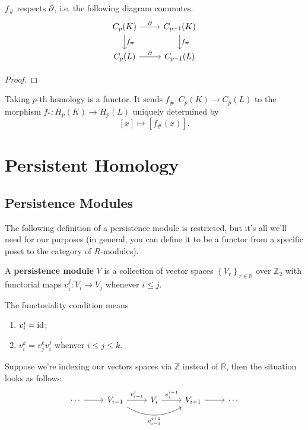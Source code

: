 \documentclass[twoside,10pt]{report}
\begin{document}
\begin{prop}
	$f_{\#}$ respects $\partial$, i.e. the following diagram commutes.
	\[
	\begin{tikzcd}
		C_{p}(K) \rar{\p}\dar{f_{\#}} & C_{p-1}(K) \dar{f_{\#}} \\
		C_{p}(L) \rar{\p} & C_{p-1}(L)
	\end{tikzcd}
	\] 
\end{prop}
\begin{proof}
\end{proof}

\begin{thrm}[]
	Taking $p$-th homology is a functor. It sends $f_{\#}:C_{p}(K)\to C_{p}(L)$ to the morphism $f_{*}:H_{p}(K) \to H_{p}(L)$ uniquely determined by
	\[
		[x] \mapsto [f_{\#}(x)].
	\] 
\end{thrm}



\chapter{Persistent Homology}

\section{Persistence Modules}

The following definition of a persistence module is restricted, but it's all we'll need for our purposes (in general, you can define it to be a functor from a specific poset to the category of $R$-modules). 

\begin{defn}[]
A \textbf{persistence module} $V$ is a collection of vector spaces $\left\{ V_{r} \right\}_{r \in \mathbb{R}}$ over $\mathbb{Z}_2$ with functorial maps $v_{i}^{j}:V_{i}\to V_{j}$ whenever $i \leq j$. 
\end{defn}
The functoriality condition means
\begin{enumerate}
	\item $v_{i}^{i} = \operatorname{id}$;
	\item $v_{i}^{k} = v_{j}^{k} v_{i}^{j}$ whenver $i \leq j \leq k$.
\end{enumerate}
Suppose we're indexing our vectors spaces via $\mathbb{Z}$ instead of $\mathbb{R}$, then the situation looks as follows.
\[
\begin{tikzcd}
	\cdots \rar & V_{i-1} \rar{v_{i-1}^{i}} \arrow[rr, bend right, "v_{i-1}^{i+1}"'] & V_{i} \rar{v_{i}^{i+1}} & V_{i+1} \rar & \cdots
\end{tikzcd}
\] 
\end{document}
